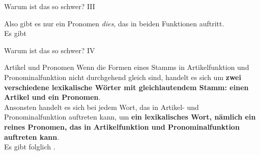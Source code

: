 \begin{frame}
  {Warum ist das so schwer? III}
  \pause
    \begin{center}
    \end{center}
    \Halbzeile
    \pause
    Also gibt es nur \alert{ein Pronomen \textit{dies}}, das \alert{in beiden Funktionen} auftritt.\\
    \pause
    \Halbzeile
   Es gibt 
\end{frame}


\begin{frame}
  {Warum ist das so schwer? IV}
  \pause
  \Zeile
  \begin{block}{Artikel und Pronomen}
    Wenn die Formen eines Stamms in Artikelfunktion und Pronominalfunktion nicht durchgehend gleich sind, handelt es sich um \alert{\textbf{zwei verschiedene lexikalische Wörter mit gleichlautendem Stamm: einen Artikel und ein Pronomen}}.\\
    \Halbzeile
    Ansonsten handelt es sich bei jedem Wort, das in Artikel- und Pronominalfunktion auftreten kann, um \alert{\textbf{ein lexikalisches Wort, nämlich ein reines Pronomen, das in Artikelfunktion und Pronominalfunktion auftreten kann}}.\\
    \Halbzeile
    Es gibt folglich .
  \end{block}
\end{frame}

